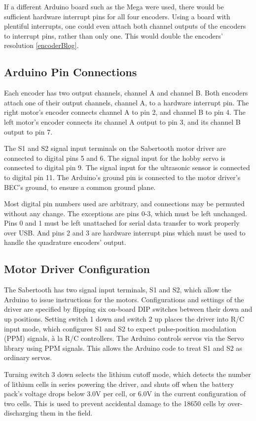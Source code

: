 If a different Arduino board such as the Mega were used, there would be sufficient hardware interrupt pins for all four encoders. Using a board with plentiful interrupts, one could even attach both channel outputs of the encoders to interrupt pins, rather than only one. This would double the encoders' resolution \ref{encoderBlog}.

\subsection{Arduino Pin Connections}
Each encoder has two output channels, channel A and channel B. Both encoders attach one of their output channels, channel A, to a hardware interrupt pin. The right motor's encoder connects channel A to pin 2, and channel B to pin 4. The left motor's encoder connects its channel A output to pin 3, and its channel B output to pin 7. 

The S1 and S2 signal input terminals on the Sabertooth motor driver are connected to digital pins 5 and 6. The signal input for the hobby servo is connected to digital pin 9. The signal input for the ultrasonic sensor is connected to digital pin 11. The Arduino's ground pin is connected to the motor driver's BEC's ground, to ensure a common ground plane.

Most digital pin numbers used are arbitrary, and connections may be permuted without any change. The exceptions are pins 0-3, which must be left unchanged. Pins 0 and 1 must be left unattached for serial data transfer to work properly over USB. And pins 2 and 3 are hardware interrupt pins which must be used to handle the quadrature encoders' output.

\subsection{Motor Driver Configuration}
The Sabertooth has two signal input terminals, S1 and S2, which allow the Arduino to issue instructions for the motors. Configurations and settings of the driver are specified by flipping six on-board DIP switches between their down and up positions. Setting switch 1 down and switch 2 up places the driver into R/C input mode, which configures S1 and S2 to expect pulse-position modulation (PPM) signals, à la R/C controllers. The Arduino controls servos via the Servo library using PPM signals. This allows the Arduino code to treat S1 and S2 as ordinary servos. \cite{sabertoothUserGuide}

Turning switch 3 down selects the lithium cutoff mode, which detects the number of lithium cells in series powering the driver, and shuts off when the battery pack's voltage drops below 3.0V per cell, or 6.0V in the current configuration of two cells. This is used to prevent accidental damage to the 18650 cells by over-discharging them in the field.

